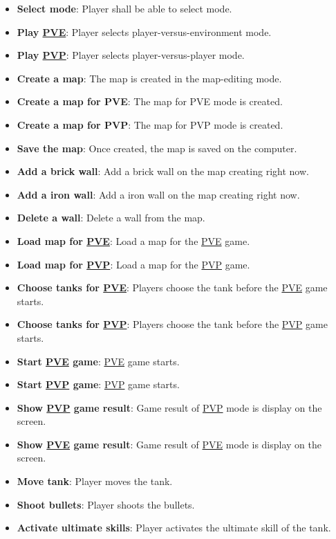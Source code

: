 \documentclass[12pt, titlepage]{article}
\begin{document}
\begin{itemize}

\item \textbf{Select mode}: Player shall be able to select mode.
\item \textbf{Play \underline{PVE}}: Player selects player-versus-environment mode.
\item \textbf{Play \underline{PVP}}: Player selects player-versus-player mode.
\item \textbf{Create a map}: The map is created in the map-editing mode.
\item \textbf{Create a map for PVE}: The map for PVE mode is created.
\item \textbf{Create a map for PVP}: The map for PVP mode is created.
\item \textbf{Save the map}: Once created, the map is saved on the computer.
\item \textbf{Add a brick wall}: Add a brick wall on the map creating right now.
\item \textbf{Add a iron wall}: Add a iron wall on the map creating right now.
\item \textbf{Delete a wall}: Delete a wall from the map.
\item \textbf{Load map for \underline{PVE}}: Load a map for the \underline{PVE} game.
\item \textbf{Load map for \underline{PVP}}: Load a map for the \underline{PVP} game.
\item \textbf{Choose tanks for \underline{PVE}}: Players choose the tank before the \underline{PVE} game starts.
\item \textbf{Choose tanks for \underline{PVP}}: Players choose the tank before the \underline{PVP} game starts.
\item \textbf{Start \underline{PVE} game}: \underline{PVE} game starts.
\item \textbf{Start \underline{PVP} game}: \underline{PVP} game starts.
\item \textbf{Show \underline{PVP} game result}: Game result of \underline{PVP} mode is display on the screen.
\item \textbf{Show \underline{PVE} game result}: Game result of \underline{PVE} mode is display on the screen.
\item \textbf{Move tank}: Player moves the tank.
\item \textbf{Shoot bullets}: Player shoots the bullets.
\item \textbf{Activate ultimate skills}: Player activates the ultimate skill of the tank.



\end{itemize}
\end{document}
